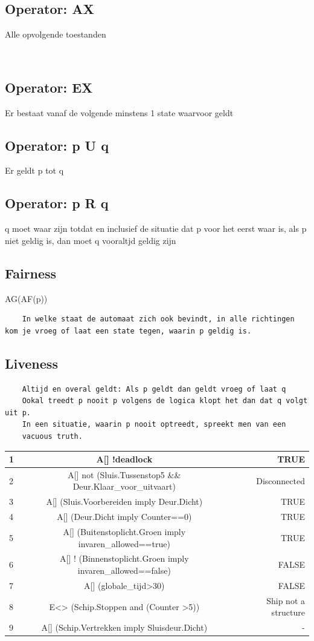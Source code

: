 \documentclass[11pt]{report} %
\begin{document}
\subsection{Operator: AX}
Alle opvolgende toestanden

~\cite{locke_2020}
\subsection{Operator: EX}
Er bestaat vanaf de volgende minstens 1 state waarvoor geldt
\subsection{Operator: p U q}
Er geldt p tot q
~\cite{gnsguides}
\subsection{Operator: p R q}
q moet waar zijn totdat en inclusief de situatie dat p voor het eerst waar is, als p niet geldig is, dan moet q vooraltjd geldig zijn
\subsection{Fairness}
AG(AF(p))
\begin{verbatim}
	In welke staat de automaat zich ook bevindt, in alle richtingen kom je vroeg of laat een state tegen, waarin p geldig is.
\end{verbatim}
\subsection{Liveness}
\begin{verbatim}
	Altijd en overal geldt: Als p geldt dan geldt vroeg of laat q
	Ookal treedt p nooit p volgens de logica klopt het dan dat q volgt uit p.
	In een situatie, waarin p nooit optreedt, spreekt men van een
	vacuous truth.
\end{verbatim}


\begin{center}
	\begin{tabular}{| l | c || r | }
		\hline
		1 &A[] !deadlock  &  TRUE \\ \hline
		2 & A[] not (Sluis.Tussenstop5 \&\& Deur.Klaar\_voor\_uitvaart)  &  Disconnected \\ \hline
		3 & A[]  (Sluis.Voorbereiden imply Deur.Dicht)   &  TRUE\\   \hline
		4 &A[]  (Deur.Dicht imply Counter==0)   & TRUE  \\   \hline
		5 & A[]  (Buitenstoplicht.Groen imply invaren\_allowed==true)  &  TRUE \\ \hline
		6 & A[] ! (Binnenstoplicht.Groen imply invaren\_allowed==false)  & FALSE \\ \hline
		7 & A[]  (globale\_tijd>30)   &  FALSE\\    \hline
		8 & E<>  (Schip.Stoppen and (Counter >5))   & Ship not a structure  \\   \hline
		9 & A[] (Schip.Vertrekken imply Sluisdeur.Dicht)  &  -  \\   \hline
		\hline
	\end{tabular}
\end{center}
\end{document}
